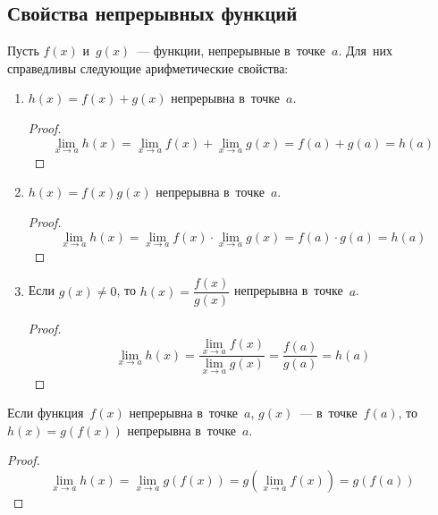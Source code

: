 \subsection{Свойства непрерывных функций}
Пусть $f(x)$ и~$g(x)$~--- функции, непрерывные в~точке~$a$.
Для~них справедливы следующие арифметические свойства:
\begin{enumerate}
	\item $h(x) = f(x) + g(x)$ непрерывна в~точке~$a$.
	\begin{proof}
	\begin{equation*}
	\lim_{x \to a} h(x) =
	\lim_{x \to a} f(x) + \lim_{x \to a} g(x) =
	f(a) + g(a) =
	h(a)
	\end{equation*}
	\end{proof}
	
	\item $h(x) = f(x)g(x)$ непрерывна в~точке~$a$.
	\begin{proof}
	\begin{equation*}
	\lim_{x \to a} h(x) =
	\lim_{x \to a} f(x) \cdot \lim_{x \to a} g(x) =
	f(a) \cdot g(a) =
	h(a)
	\end{equation*}
	\end{proof}
	
	\item Если $g(x) \neq 0$, то $h(x) = \dfrac{f(x)}{g(x)}$ непрерывна в~точке~$a$.
	\begin{proof}
	\begin{equation*}
	\lim_{x \to a} h(x) =
	\frac{\lim_{x \to a} f(x)}{\lim_{x \to a} g(x)} =
	\frac{f(a)}{g(a)} =
	h(a)
	\end{equation*}
	\end{proof}
\end{enumerate}

\begin{statement}
Если функция~$f(x)$ непрерывна в~точке~$a$, $g(x)$~--- в~точке~$f(a)$, то $h(x) = g(f(x))$ непрерывна в~точке~$a$.
\end{statement}
\begin{proof}
\begin{equation*}
\lim_{x \to a} h(x) = \lim_{x \to a} g(f(x)) = g(\lim_{x \to a} f(x)) = g(f(a))
\end{equation*}
\end{proof}

